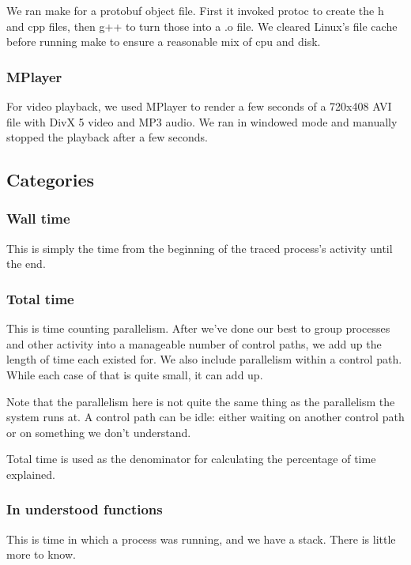 \documentclass[10pt]{article}
\begin{document}
We ran make for a protobuf object file.\cite{pb}  First it invoked protoc to create the h and cpp files, then g++ to turn those into a .o file.  We cleared Linux's file cache before running make to ensure a reasonable mix of cpu and disk.

\subsubsection{MPlayer}

For video playback, we used MPlayer to render a few seconds of a 720x408 AVI file with DivX 5 video and MP3 audio.  We ran in windowed mode and manually stopped the playback after a few seconds.

\subsection{Categories}

\subsubsection{Wall time}

This is simply the time from the beginning of the traced process's activity until the end.

\subsubsection{Total time}

This is time counting parallelism.  After we've done our best to group processes and other activity into a manageable number of control paths, we add up the length of time each existed for.  We also include parallelism within a control path.  While each case of that is quite small, it can add up.

Note that the parallelism here is not quite the same thing as the parallelism the system runs at.  A control path can be idle: either waiting on another control path or on something we don't understand.

Total time is used as the denominator for calculating the percentage of time explained.

\subsubsection{In understood functions}

This is time in which a process was running, and we have a stack.  There is little more to know.
\end{document}
